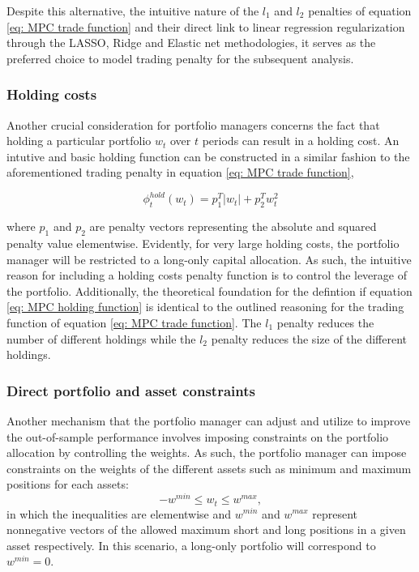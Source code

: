 Despite this alternative, the intuitive nature of the $l_1$ and $l_2$ penalties of equation \ref{eq: MPC trade function} and their direct link to linear regression regularization through the LASSO, Ridge and Elastic net methodologies, it serves as the preferred choice to model trading penalty for the subsequent analysis.

\subsubsection{Holding costs}
Another crucial consideration for portfolio managers concerns the fact that holding a particular portfolio $w_t$ over $t$ periods can result in a holding cost. An intutive and basic holding function can be constructed in a similar fashion to the aforementioned trading penalty in equation \ref{eq: MPC trade function},

\begin{equation}
    \phi_t^{hold}(w_t) = p_1^T|w_t| + p_2^Tw_t^2
    \label{eq: MPC holding function}
\end{equation}

where $p_1$ and $p_2$ are penalty vectors representing the absolute and squared penalty value elementwise. Evidently, for very large holding costs, the portfolio manager will be restricted to a long-only capital allocation. As such, the intuitive reason for including a holding costs penalty function is to control the leverage of the portfolio. Additionally, the theoretical foundation for the defintion if equation \ref{eq: MPC holding function} is identical to the outlined reasoning for the trading function of equation \ref{eq: MPC trade function}. The $l_1$ penalty reduces the number of different holdings while the $l_2$ penalty reduces the size of the different holdings.

\subsubsection{ Direct portfolio and asset constraints}
Another mechanism that the portfolio manager can adjust and utilize to improve the out-of-sample performance involves imposing constraints on the portfolio allocation by controlling the weights. As such, the portfolio manager can impose constraints on the weights of the different assets such as minimum and maximum positions for each assets:
\begin{equation}
    -w^{min}\leq w_t\leq w^{max},
\end{equation}
in which the inequalities are elementwise and $w^{min}$ and $w^{max}$ represent nonnegative vectors of the allowed maximum short and long positions in a given asset respectively. In this scenario, a long-only portfolio will correspond to $w^{min}=0$.


